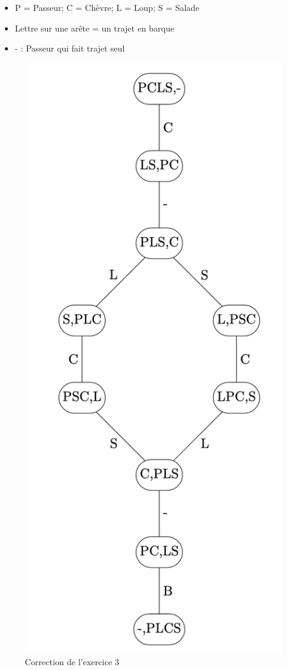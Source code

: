 \documentclass[10pt,a4paper]{article}
\begin{document}
\begin{tcolorbox}
\begin{itemize}
    \item P = Passeur; C = Chèvre; L = Loup; S = Salade
    \item Lettre sur une arête = un trajet en barque
    \item - : Passeur qui fait trajet seul
\end{itemize}
\end{tcolorbox}
\begin{figure}
    \centering
    \includegraphics[scale=0.5]{passeur.png}
    \caption{Correction de l'exercice 3}
    \label{fig:my_label}
\end{figure}
\end{document}
